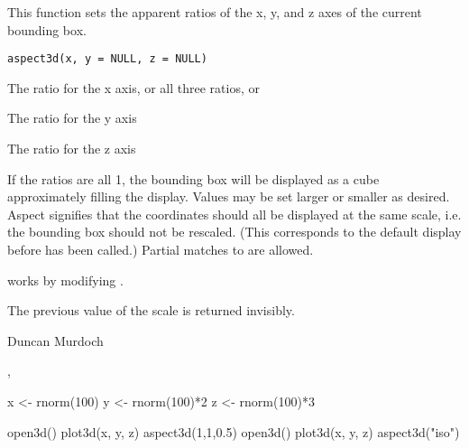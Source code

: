 \begin{Description}\relax
This function sets the apparent ratios of the x, y, and z axes
of the current bounding box.
\end{Description}
\begin{Usage}
\begin{verbatim}
aspect3d(x, y = NULL, z = NULL)
\end{verbatim}
\end{Usage}
\begin{Arguments}
\begin{ldescription}
\item[\code{x}] The ratio for the x axis, or all three ratios, or  
\item[\code{y}] The ratio for the y axis 
\item[\code{z}] The ratio for the z axis 
\end{ldescription}
\end{Arguments}
\begin{Details}\relax
If the ratios are all 1, the bounding box will be displayed as a cube approximately filling the display.
Values may be set larger or smaller as desired.  Aspect  signifies that the
coordinates should all be displayed at the same scale, i.e. the bounding box should not be
rescaled.  (This corresponds to the default display before  has been called.)
Partial matches to  are allowed.

 works by modifying .
\end{Details}
\begin{Value}
The previous value of the scale is returned invisibly.
\end{Value}
\begin{Author}\relax
Duncan Murdoch
\end{Author}
\begin{SeeAlso}\relax
{}, 
\end{SeeAlso}
\begin{Examples}
\begin{ExampleCode}
  x <- rnorm(100)
  y <- rnorm(100)*2
  z <- rnorm(100)*3
  
  open3d()
  plot3d(x, y, z)
  aspect3d(1,1,0.5)
  open3d()
  plot3d(x, y, z)
  aspect3d("iso")
\end{ExampleCode}
\end{Examples}

